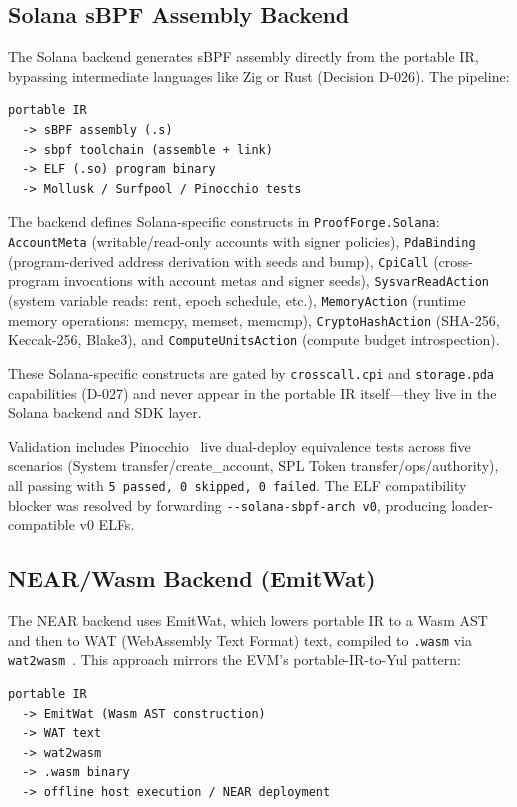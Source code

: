 \documentclass[sigconf]{acmart}
\begin{document}
\subsection{Solana sBPF Assembly Backend}

The Solana backend generates sBPF assembly directly from the portable IR, bypassing
intermediate languages like Zig or Rust (Decision D-026). The pipeline:

\begin{lstlisting}[style=textcode]
portable IR
  -> sBPF assembly (.s)
  -> sbpf toolchain (assemble + link)
  -> ELF (.so) program binary
  -> Mollusk / Surfpool / Pinocchio tests
\end{lstlisting}

The backend defines Solana-specific constructs in \texttt{ProofForge.Solana}:
\texttt{AccountMeta} (writable/read-only accounts with signer policies),
\texttt{PdaBinding} (program-derived address derivation with seeds and bump),
\texttt{CpiCall} (cross-program invocations with account metas and signer seeds),
\texttt{SysvarReadAction} (system variable reads: rent, epoch schedule, etc.),
\texttt{MemoryAction} (runtime memory operations: memcpy, memset, memcmp),
\texttt{CryptoHashAction} (SHA-256, Keccak-256, Blake3), and
\texttt{ComputeUnitsAction} (compute budget introspection).

These Solana-specific constructs are gated by \texttt{crosscall.cpi} and \texttt{storage.pda}
capabilities (D-027) and never appear in the portable IR itself---they live in the Solana
backend and SDK layer.

Validation includes Pinocchio~\cite{pinocchio} live dual-deploy equivalence tests across five
scenarios (System transfer/create\_account, SPL Token transfer/ops/authority), all passing with
\texttt{5 passed, 0 skipped, 0 failed}. The ELF compatibility blocker was resolved by forwarding
\texttt{-{}-solana-sbpf-arch~v0}, producing loader-compatible v0 ELFs.

\subsection{NEAR/Wasm Backend (EmitWat)}

The NEAR backend uses EmitWat, which lowers portable IR to a Wasm AST and then to WAT
(WebAssembly Text Format) text, compiled to \texttt{.wasm} via \texttt{wat2wasm}~\cite{wasm}.
This approach mirrors the EVM's portable-IR-to-Yul pattern:

\begin{lstlisting}[style=textcode]
portable IR
  -> EmitWat (Wasm AST construction)
  -> WAT text
  -> wat2wasm
  -> .wasm binary
  -> offline host execution / NEAR deployment
\end{lstlisting}
\end{document}
